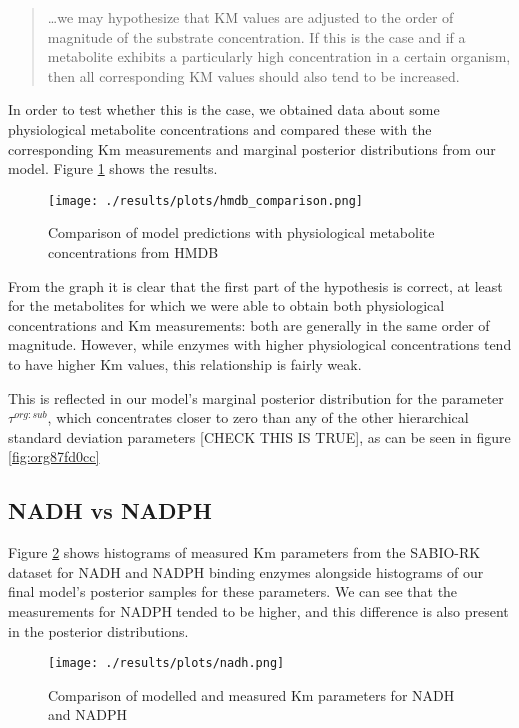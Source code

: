 \documentclass[11pt]{article}
\begin{document}
\begin{quote}
\ldots{}we may hypothesize that KM values are adjusted to the order of magnitude of
the substrate concentration. If this is the case and if a metabolite exhibits a
particularly high concentration in a certain organism, then all corresponding KM
values should also tend to be increased.
\end{quote}

In order to test whether this is the case, we obtained data about some
physiological metabolite concentrations and compared these with the
corresponding Km measurements and marginal posterior distributions from our
model. Figure \ref{fig:orga8d7e8c} shows the results.

\begin{figure}[htbp]
\centering
\texttt{[image: ./results/plots/hmdb\_comparison.png]}
\caption{\label{fig:orga8d7e8c}Comparison of model predictions with physiological metabolite concentrations from HMDB}
\end{figure}

From the graph it is clear that the first part of the hypothesis is correct, at
least for the metabolites for which we were able to obtain both physiological
concentrations and Km measurements: both are generally in the same order of
magnitude. However, while enzymes with higher physiological concentrations tend
to have higher Km values, this relationship is fairly weak.

This is reflected in our model's marginal posterior distribution for the
parameter \(\tau^{org:sub}\), which concentrates closer to zero than any of the
other hierarchical standard deviation parameters [CHECK THIS IS TRUE], as can be
seen in figure \ref{fig:org87fd0cc}

\subsection{NADH vs NADPH}
\label{sec:orgbf6cfd7}

Figure \ref{fig:org5160100} shows histograms of measured Km parameters from the SABIO-RK
dataset for NADH and NADPH binding enzymes alongside histograms of our final
model's posterior samples for these parameters. We can see that the measurements
for NADPH tended to be higher, and this difference is also present in the posterior
distributions.

\begin{figure}[htbp]
\centering
\texttt{[image: ./results/plots/nadh.png]}
\caption{\label{fig:org5160100}Comparison of modelled and measured Km parameters for NADH and NADPH}
\end{figure}
\end{document}

